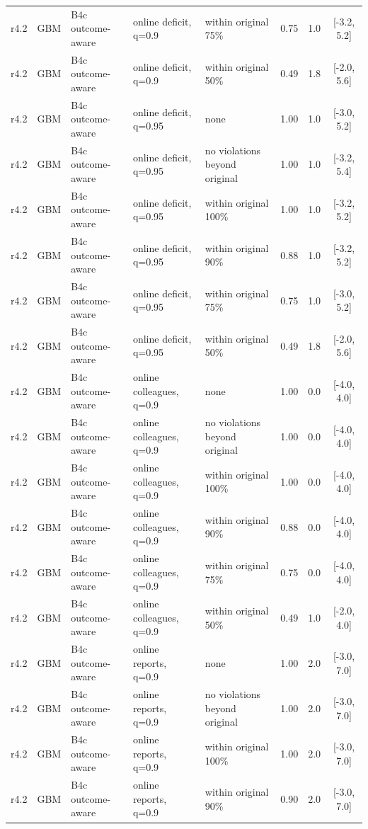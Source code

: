 \documentclass[10pt,onecolumn,letterpaper]{article}
\begin{document}
\begin{longtable}{lllp{4.2cm}p{3.4cm}ccc}
r4.2 & GBM & B4c outcome-aware & online deficit, q=0.9 & within original 75\% & 0.75 & 1.0 & [-3.2, 5.2] \\
r4.2 & GBM & B4c outcome-aware & online deficit, q=0.9 & within original 50\% & 0.49 & 1.8 & [-2.0, 5.6] \\
r4.2 & GBM & B4c outcome-aware & online deficit, q=0.95 & none & 1.00 & 1.0 & [-3.0, 5.2] \\
r4.2 & GBM & B4c outcome-aware & online deficit, q=0.95 & no violations beyond original & 1.00 & 1.0 & [-3.2, 5.4] \\
r4.2 & GBM & B4c outcome-aware & online deficit, q=0.95 & within original 100\% & 1.00 & 1.0 & [-3.2, 5.2] \\
r4.2 & GBM & B4c outcome-aware & online deficit, q=0.95 & within original 90\% & 0.88 & 1.0 & [-3.2, 5.2] \\
r4.2 & GBM & B4c outcome-aware & online deficit, q=0.95 & within original 75\% & 0.75 & 1.0 & [-3.0, 5.2] \\
r4.2 & GBM & B4c outcome-aware & online deficit, q=0.95 & within original 50\% & 0.49 & 1.8 & [-2.0, 5.6] \\
r4.2 & GBM & B4c outcome-aware & online colleagues, q=0.9 & none & 1.00 & 0.0 & [-4.0, 4.0] \\
r4.2 & GBM & B4c outcome-aware & online colleagues, q=0.9 & no violations beyond original & 1.00 & 0.0 & [-4.0, 4.0] \\
r4.2 & GBM & B4c outcome-aware & online colleagues, q=0.9 & within original 100\% & 1.00 & 0.0 & [-4.0, 4.0] \\
r4.2 & GBM & B4c outcome-aware & online colleagues, q=0.9 & within original 90\% & 0.88 & 0.0 & [-4.0, 4.0] \\
r4.2 & GBM & B4c outcome-aware & online colleagues, q=0.9 & within original 75\% & 0.75 & 0.0 & [-4.0, 4.0] \\
r4.2 & GBM & B4c outcome-aware & online colleagues, q=0.9 & within original 50\% & 0.49 & 1.0 & [-2.0, 4.0] \\
r4.2 & GBM & B4c outcome-aware & online reports, q=0.9 & none & 1.00 & 2.0 & [-3.0, 7.0] \\
r4.2 & GBM & B4c outcome-aware & online reports, q=0.9 & no violations beyond original & 1.00 & 2.0 & [-3.0, 7.0] \\
r4.2 & GBM & B4c outcome-aware & online reports, q=0.9 & within original 100\% & 1.00 & 2.0 & [-3.0, 7.0] \\
r4.2 & GBM & B4c outcome-aware & online reports, q=0.9 & within original 90\% & 0.90 & 2.0 & [-3.0, 7.0] \\

\end{longtable}
\end{document}

